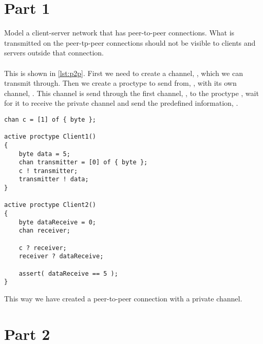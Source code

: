 \documentclass[Main]{subfiles}
\begin{document}
\section*{Part 1}

Model a client-server network that has peer-to-peer connections.
What is transmitted on the peer-tp-peer connections should not be visible to clients and servers outside that connection.
\\
\\
This is shown in \codeTitle \ref{lst:p2p}.
First we need to create a channel, , which we can transmit through.
Then we create a proctype to send from, , with its own channel, .
This channel is send through the first channel, , to the proctype , wait for it to receive the private channel and send the predefined information, .

\begin{lstlisting}[caption=Peer-to-peer network, style=Code-C, label=lst:p2p]
chan c = [1] of { byte }; 

active proctype Client1()
{
	byte data = 5;
	chan transmitter = [0] of { byte }; 
	c ! transmitter;
	transmitter ! data;
}

active proctype Client2()
{
	byte dataReceive = 0;
	chan receiver;

	c ? receiver;
	receiver ? dataReceive;
	
	assert( dataReceive == 5 );
}
\end{lstlisting}
This way we have created a peer-to-peer connection with a private channel.

\newpage
\section*{Part 2}
\end{document}
